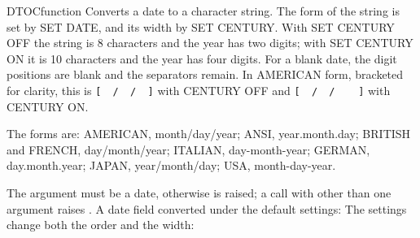 \begin{XbaseEntry}{DTOC}{function}
Converts a date to a character string.
\Syntax
{}
\Usage
The form of the string is set by SET DATE, and its width by SET CENTURY. With SET CENTURY OFF the string is 8 characters and the year has two digits; with SET CENTURY ON it is 10 characters and the year has four digits. For a blank date, the digit positions are blank and the separators remain. In AMERICAN form, bracketed for clarity, this is \texttt{[~~/~~/~~]} with CENTURY OFF and \texttt{[~~/~~/~~~~]} with CENTURY ON.

The forms are: AMERICAN, month/day/year; ANSI, year.month.day; BRITISH and FRENCH, day/month/year; ITALIAN, day-month-year; GERMAN, day.month.year; JAPAN, year/month/day; USA, month-day-year.

The argument must be a date, otherwise  is raised; a call with other than one argument raises .
\Examples
A date field converted under the default settings:
The settings change both the order and the width:
\end{XbaseEntry}

